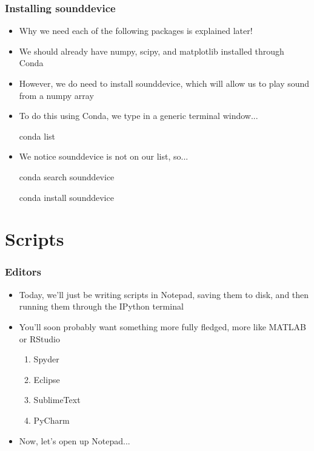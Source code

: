 \documentclass{beamer}\usepackage[]{graphicx}\usepackage[]{color}
\begin{document}
\begin{frame}[fragile]
\frametitle{Installing sounddevice}
	\begin{itemize}
		\item Why we need each of the following packages is explained later!

		\item We should already have numpy, scipy, and matplotlib installed through Conda

		\item However, we do need to install sounddevice, which will allow us to play sound from a numpy array

		\item To do this using Conda, we type in a generic terminal window... 

		conda list

		\item We notice sounddevice is not on our list, so...

		conda search sounddevice
		
		conda install sounddevice

	\end{itemize}
\end{frame}

\section{Scripts}

\begin{frame}
\frametitle{Editors}
\begin{itemize}
	\item Today, we'll just be writing scripts in Notepad, saving them to disk, and then running them through the IPython terminal 
	\item You'll soon probably want something more fully fledged, more like MATLAB or RStudio
	\begin{enumerate}
		\item Spyder

		\item Eclipse

		\item SublimeText

		\item PyCharm
	\end{enumerate}

	\item Now, let's open up Notepad... 
\end{itemize}
\end{frame}
\end{document}
